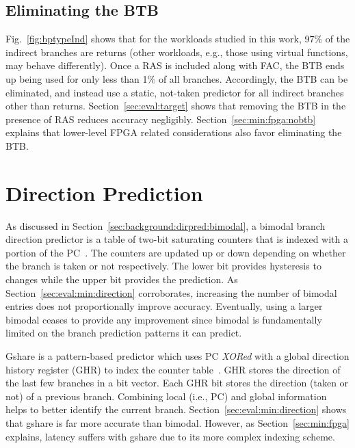 \subsection{Eliminating the BTB}
\label{sec:min:target:nobtb}
Fig.~\ref{fig:bptypeInd} shows that for the workloads studied in this work, 97\% of the indirect branches are returns (other workloads, e.g., those using virtual functions, may behave differently). Once a RAS is included along with FAC, the BTB ends up being used for only less than 1\% of all branches. Accordingly, the BTB can be eliminated, and instead use a static, not-taken predictor for all indirect branches other than returns. Section~\ref{sec:eval:target} shows that removing the BTB in the presence of RAS reduces accuracy negligibly. Section~\ref{sec:min:fpga:nobtb} explains that lower-level FPGA related considerations also favor eliminating the BTB.

\section{Direction Prediction}
\label{sec:min:direction}
As discussed in Section~\ref{sec:background:dirpred:bimodal}, a bimodal branch direction predictor is a table of two-bit saturating counters that is indexed with a portion of the PC~\cite{bimodal}. The counters are updated up or down depending on whether the branch is taken or not respectively. The lower bit provides hysteresis to changes while the upper bit provides the prediction. As Section~\ref{sec:eval:min:direction} corroborates, increasing the number of bimodal entries does not proportionally improve accuracy. Eventually, using a larger bimodal ceases to provide any improvement since bimodal is fundamentally limited on the branch prediction patterns it can predict.

Gshare is a pattern-based predictor which uses PC \textit{XORed} with a global direction history register (GHR) to index the counter table~\cite{McFarling}. GHR stores the direction of the last few branches in a bit vector. Each GHR bit stores the direction (taken or not) of a previous branch. Combining local (i.e., PC) and global information helps to better identify the current branch. Section~\ref{sec:eval:min:direction} shows that gshare is far more accurate than bimodal. However, as Section~\ref{sec:min:fpga} explains, latency suffers with gshare due to its more complex indexing scheme.

